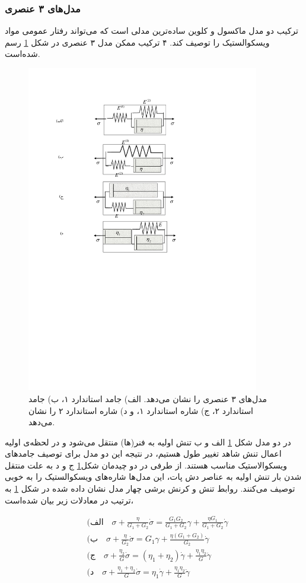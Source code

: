 \subsubsection{مدل‌های ۳ عنصری}
ترکیب دو مدل ماکسول و کلوین ساده‌ترین مدلی است که می‌تواند رفتار عمومی مواد ویسکوالستیک را توصیف کند. ۴ ترکیب ممکن مدل ۳ عنصری در شکل \ref{fig:MK} رسم شده‌است.
\begin{figure}[htbp]
\begin{center}
\includegraphics[width=4in]{Figs/MK}
\caption{
مدل‌های ۳ عنصری را نشان می‌دهد. الف) جامد استاندارد ۱، ب) جامد استاندارد ۲، ج) شاره استاندارد ۱، و د) شاره استاندارد ۲ را نشان می‌دهد.
}
\label{fig:MK}
\end{center}
\end{figure}
در دو مدل‌ شکل \ref{fig:MK} الف و ب   تنش اولیه به فنر(ها) منتقل می‌شود و در لحظه‌ی اولیه اعمال تنش شاهد تغییر طول هستیم، در نتیجه این دو مدل برای توصیف جامدهای ویسکوالاستیک مناسب هستند. از طرفی در دو چیدمان شکل\ref{fig:MK} ج و د به علت منتقل شدن بار تنش اولیه به عناصر دش پات، این مدل‌ها شاره‌های ویسکوالستیک را به خوبی توصیف می‌کنند. روابط تنش و کرنش برشی چهار مدل نشان داده شده در شکل \ref{fig:MK} به ترتیب در معادلات زیر بیان شده‌است،

\begin{equation*}
\begin{aligned}
& \text{(الف} \quad \sigma+\frac{\eta}{G_1+G_2}\dot\sigma= \frac{G_1G_2}{G_1+G_2}\gamma+\frac{\eta G_1}{G_1+G_2}\dot\gamma\\
& \text{(ب} \quad \sigma+\frac{\eta}{G_2}\dot\sigma= G_1\gamma+\frac{\eta (G_1+G_2)}{G_2}\dot\gamma\\
& \text{(ج} \quad \sigma+\frac{\eta_2}{G}\dot\sigma= (\eta_1+\eta_2)\dot\gamma+\frac{\eta_1\eta_2}{G}\ddot\gamma\\
& \text{(د} \quad \sigma+\frac{\eta_1+\eta_2}{G}\dot\sigma= \eta_1\dot\gamma+\frac{\eta_1\eta_2}{G}\ddot\gamma
\end{aligned}
\end{equation*}


